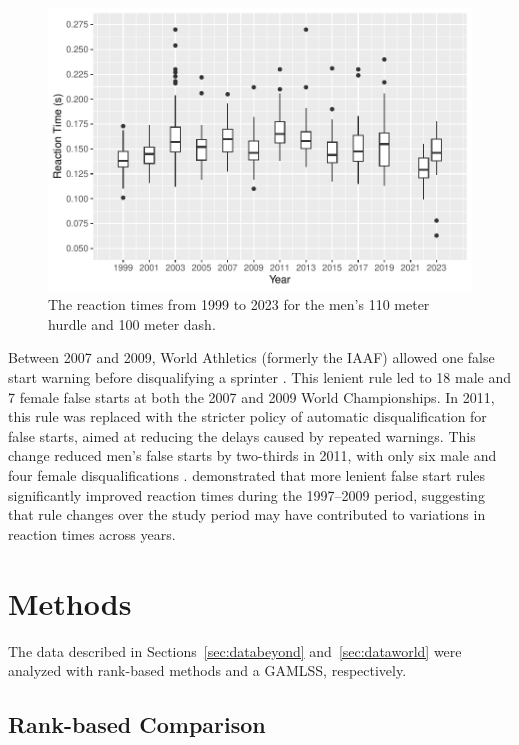 \documentclass[12pt, letterpaper]{article}
\begin{document}
\begin{figure}[tbp]
  \centering
  \includegraphics[width=\textwidth]{Boxplot}
  \caption{The reaction times from 1999 to 2023 for the men's 110 meter hurdle
  and 100 meter dash.}
  \label{fig:Boxplot}
\end{figure}


Between 2007 and 2009, World Athletics (formerly the IAAF) allowed one 
false start warning before disqualifying a sprinter \citep{iaaf2009falsestart}. 
This lenient rule led to 18 male and 7 female false starts at both the 2007 
and 2009 World Championships. In 2011, this rule was replaced with the stricter 
policy of automatic disqualification for false starts, aimed at reducing the 
delays caused by repeated warnings. This change reduced men’s false starts 
by two-thirds in 2011, with only six male and four female disqualifications 
\citep{iaaf2009falsestart}. \citet{haugen2013effect} demonstrated that more 
lenient false start rules significantly improved reaction times during the 
1997–2009 period, suggesting that rule changes over the study period may 
have contributed to variations in reaction times across years.


\section{Methods} \label{sec:methods}

The data described in Sections~\ref{sec:databeyond} and~\ref{sec:dataworld} were
analyzed with rank-based methods and a GAMLSS, respectively.


\subsection{Rank-based Comparison}\label{sec:rank}
\end{document}
